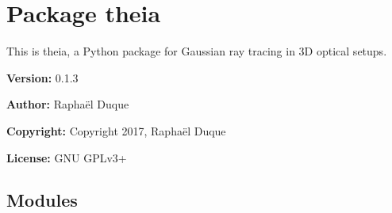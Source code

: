 %
%
%


\section{Package theia}

    \label{theia}
This is theia, a Python package for Gaussian ray tracing in 3D optical 
setups.

\textbf{Version:} 0.1.3



\textbf{Author:} Raphaël Duque



\textbf{Copyright:} Copyright 2017, Raphaël Duque



\textbf{License:} GNU GPLv3+





\subsection{Modules}

